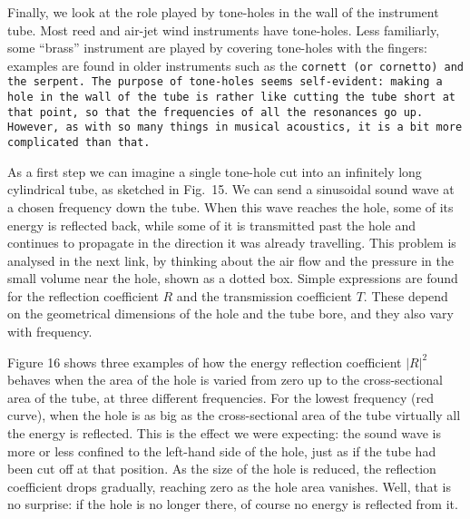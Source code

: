   Finally, we look at the role played by tone-holes in the wall of the 
  instrument tube. Most reed and air-jet wind instruments have tone-holes. Less 
  familiarly, some “brass” instrument are played by covering tone-holes with 
  the fingers: examples are found in older instruments such as the 
  \tt{}cornett\rm{} (or cornetto) and the \tt{}serpent\rm{}. The purpose of 
  tone-holes seems self-evident: making a hole in the wall of the tube is 
  rather like cutting the tube short at that point, so that the frequencies of 
  all the resonances go up. However, as with so many things in musical 
  acoustics, it is a bit more complicated than that. 


  As a first step we can imagine a single tone-hole cut into an infinitely long 
  cylindrical tube, as sketched in Fig.\ 15. We can send a sinusoidal sound 
  wave at a chosen frequency down the tube. When this wave reaches the hole, 
  some of its energy is reflected back, while some of it is transmitted past 
  the hole and continues to propagate in the direction it was already 
  travelling. This problem is analysed in the next link, by thinking about the 
  air flow and the pressure in the small volume near the hole, shown as a 
  dotted box. Simple expressions are found for the reflection coefficient $R$ 
  and the transmission coefficient $T$. These depend on the geometrical 
  dimensions of the hole and the tube bore, and they also vary with frequency. 

  Figure 16 shows three examples of how the energy reflection coefficient 
  $|R|^2$ behaves when the area of the hole is varied from zero up to the 
  cross-sectional area of the tube, at three different frequencies. For the 
  lowest frequency (red curve), when the hole is as big as the cross-sectional 
  area of the tube virtually all the energy is reflected. This is the effect we 
  were expecting: the sound wave is more or less confined to the left-hand side 
  of the hole, just as if the tube had been cut off at that position. As the 
  size of the hole is reduced, the reflection coefficient drops gradually, 
  reaching zero as the hole area vanishes. Well, that is no surprise: if the 
  hole is no longer there, of course no energy is reflected from it. 

